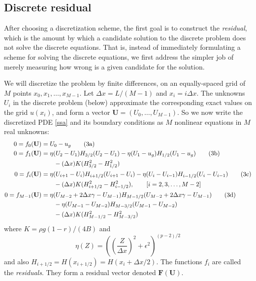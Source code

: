 \documentclass[11pt,final,reqno]{amsart}
\newcommand{\eps}{\epsilon}
\newcommand{\bbF}{\mathbf{F}}
\newcommand{\bU}{\mathbf{U}}
\begin{document}
\subsection*{Discrete residual}   After choosing a discretization scheme, the first goal is to construct the \emph{residual}, which is the amount by which a candidate solution to the discrete problem does not solve the discrete equations.  That is, instead of immediately formulating a scheme for solving the discrete equations, we first address the simpler job of merely measuring how wrong is a given candidate for the solution.

We will discretize the problem by finite differences, on an equally-spaced grid of $M$ points $x_0,x_1,\dots,x_{M-1}$.  Let $\Delta x = L / (M-1)$ and $x_i = i \Delta x$.  The unknowns $U_i$ in the discrete problem (below) approximate the corresponding exact values on the grid $u(x_i)$, and form a vector $\bU = (U_0,\dots,U_{M-1})$.  So we now write the discretized PDE \eqref{ssa} and its boundary conditions as $M$ nonlinear equations in $M$ real unknowns:
\begin{align}
  0 = f_0(\bU) &= U_0 - u_g \tag{3a} \label{reszero} \\
  0 = f_1(\bU) &= \eta(U_2-U_1) H_{3/2} (U_2 - U_1) - \eta(U_1 - u_g) H_{1/2} (U_1 - u_g) \tag{3b} \label{resone}\\
               &\qquad - (\Delta x) K (H_{3/2}^2 - H_{1/2}^2) \notag \\
  0 = f_i(\bU) &= \eta(U_{i+1}-U_i) H_{i+1/2} (U_{i+1} - U_i) - \eta(U_i - U_{i-1}) H_{i-1/2} (U_i - U_{i-1}) \tag{3c}  \label{resi}\\
               &\qquad - (\Delta x) K (H_{i+1/2}^2 - H_{i-1/2}^2), \qquad [i=2,3,\dots,M-2] \notag \\
  0 = f_{M-1}(\bU) &= \eta(U_{M-2} + 2\Delta x \gamma - U_{M-1}) H_{M-1/2} (U_{M-2} + 2\Delta x \gamma - U_{M-1})  \tag{3d} \label{resend} \\
               &\qquad - \eta(U_{M-1} - U_{M-2}) H_{M-3/2} (U_{M-1} - U_{M-2}) \notag\\
               &\qquad - (\Delta x) K (H_{M-1/2}^2 - H_{M-3/2}^2) \notag
\end{align}
where $K = \rho g (1-r)/(4 B)$ and \setcounter{equation}{3}
\begin{equation}
  \eta(Z) = \left(\left(\frac{Z}{\Delta x}\right)^2 + \eps^2\right)^{(p-2)/2} \label{visc}
\end{equation}
and also $H_{i+1/2} = H(x_{i+1/2}) = H(x_i + \Delta x / 2)$.  The functions $f_i$ are called the \emph{residuals}.  They form a residual vector denoted $\bbF(\bU)$.
\end{document}
